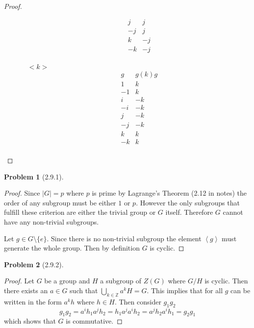 \documentclass[10pt]{article}
\newcommand{\sk}{\vskip 10mm}
\newcommand{\bb}[1]{\mathbb{#1}}
\theoremstyle{plain}
\newtheorem{problem}{Problem}
\theoremstyle{remark}
\begin{document}
\begin{proof}
\begin{enumerate}
\begin{itemize}
\[\begin{array}{c|c}
          j & j\\
          -j & j\\
          k & -j\\
          -k & -j\\
        \end{array}
      \]
    \item[$<k>$]
      \[
        \begin{array}{c|c}
          g & g(k)g\\
          \hline 
          1 & k\\
          -1 & k\\
          i & -k\\
          -i & -k\\
          j & -k\\
          -j & -k\\
          k & k\\
          -k & k\\
        \end{array}
      \]
    \end{itemize}
  \end{enumerate}
\end{proof}

\sk

\begin{problem}[2.9.1]
  
\end{problem}

\begin{proof}
  Since $|G|=p$ where $p$ is prime by Lagrange's Theorem (2.12 in notes)
  the order of any subgroup must be either $1$ or $p$. However the
  only subgroups that fulfill these criterion are either the trivial
  group or $G$ itself. Therefore $G$ cannot have any non-trivial subgroups.

  Let $g\in G\setminus \{e\}$. Since there is no non-trivial subgroup the element
  $\left<g\right>$ must generate the whole group. Then by definition
  $G$ is cyclic.
\end{proof}

\sk

\begin{problem}[2.9.2]
  
\end{problem}

\begin{proof}
  Let $G$ be a group and $H$ a subgroup of $Z(G)$ where $G/H$ is cyclic.
  Then there exists an $a\in G$ such that $\bigcup_{k\in \bb{Z}}a^kH=G$. This
  implies that for all $g$ can be written in the form $a^kh$ where $h\in H$.
  Then consider $g_1g_2$
  \[ g_1g_2=a^ih_1a^jh_2=h_1a^ja^ih_2=a^jh_2a^ih_1=g_2g_1\]
  which shows that $G$ is commutative.
\end{proof}
\end{document}
